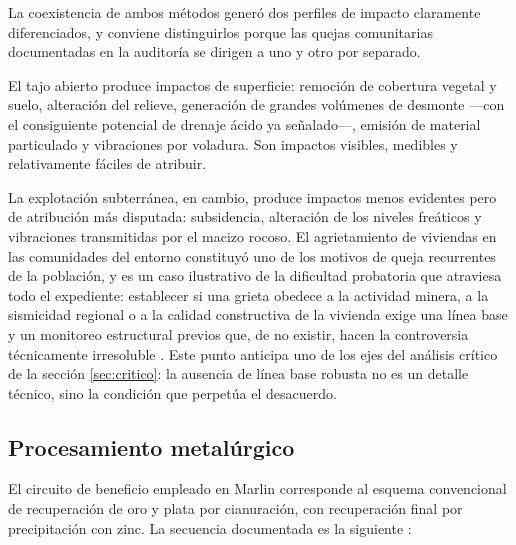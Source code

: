 La coexistencia de ambos métodos generó dos perfiles de impacto claramente
diferenciados, y conviene distinguirlos porque las quejas comunitarias
documentadas en la auditoría se dirigen a uno y otro por separado.

El tajo abierto produce impactos de superficie: remoción de cobertura vegetal y
suelo, alteración del relieve, generación de grandes volúmenes de desmonte —con
el consiguiente potencial de drenaje ácido ya señalado—, emisión de material
particulado y vibraciones por voladura. Son impactos visibles, medibles y
relativamente fáciles de atribuir.

La explotación subterránea, en cambio, produce impactos menos evidentes pero de
atribución más disputada: subsidencia, alteración de los niveles freáticos y
vibraciones transmitidas por el macizo rocoso. El agrietamiento de viviendas en
las comunidades del entorno constituyó uno de los motivos de queja recurrentes de
la población, y es un caso ilustrativo de la dificultad probatoria que atraviesa
todo el expediente: establecer si una grieta obedece a la actividad minera, a la
sismicidad regional o a la calidad constructiva de la vivienda exige una línea
base y un monitoreo estructural previos que, de no existir, hacen la controversia
técnicamente irresoluble \parencite{oncommonground2010hria}. Este punto anticipa
uno de los ejes del análisis crítico de la sección \ref{sec:critico}: la ausencia
de línea base robusta no es un detalle técnico, sino la condición que perpetúa el
desacuerdo.

\subsection{Procesamiento metalúrgico}

El circuito de beneficio empleado en Marlin corresponde al esquema convencional de
recuperación de oro y plata por cianuración, con recuperación final por
precipitación con zinc. La secuencia documentada es la siguiente
\parencite{sec2011ni43101}:

